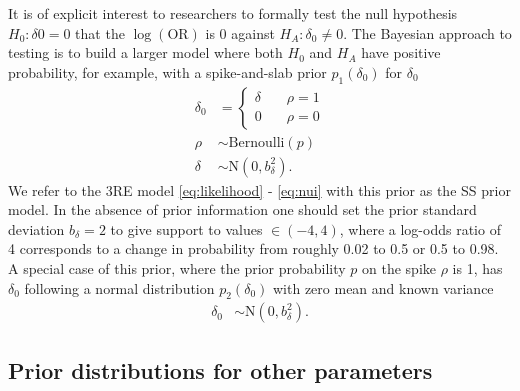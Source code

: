 \documentclass[AMA,STIX1COL]{WileyNJD-v2}
\begin{document}
It is of explicit interest to researchers to formally test the null hypothesis $H_0: \delta0 = 0$ that the $\log(\mbox{OR})$ is 0 against $H_A: \delta_0 \ne 0$. The Bayesian approach to testing is to build a larger model where both $H_0$ and $H_A$ have positive probability, for example, with a spike-and-slab prior $p_1(\delta_0)$ for $\delta_0$
\begin{align}
\delta_0 & = \left\{
		\begin{array}{ll}
			\delta &\quad \rho = 1 \\
			0 &\quad \rho = 0
		\end{array}
		\right. \label{eq:delta0spike}\\
\rho &\sim \mbox{Bernoulli}(p) \label{eq:spike} \\
\delta &\sim \mbox{N}(0, b_\delta^2). \label{eq:delta}
\end{align}
\noindent We refer to the 3RE model \eqref{eq:likelihood} - \eqref{eq:nui} with this prior as the SS prior model. In the absence of prior information one should set the prior standard deviation $b_\delta = 2$ to give support to values $\in (-4, 4)$, where a log-odds ratio of 4 corresponds to a change in probability from roughly 0.02 to 0.5 or 0.5 to 0.98. A special case of this prior, where the prior probability $p$ on the spike $\rho$ is 1, has $\delta_0$ following a normal distribution $p_2(\delta_0)$ with zero mean and known variance
\begin{align}
\delta_0 &\sim \mbox{N}(0, b_\delta^2). \label{eq:delta0}
\end{align}

\subsection{Prior distributions for other parameters} \label{sec:priors}
\end{document}
